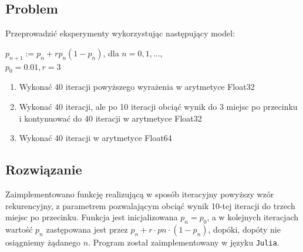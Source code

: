 \documentclass{article}
\begin{document}
        \subsection{Problem}
            Przeprowadzić eksperymenty wykorzystując następujący model:
            \begin{center}
                $p_{n+1} := p_n + rp_{n}(1 - p_n)$, dla $n = 0, 1, . . . ,$ \\
                $p_0 = 0.01, r = 3$
            \end{center}
            \begin{enumerate}
                \item Wykonać 40 iteracji powyższego wyrażenia w arytmetyce Float32
                \item Wykonać 40 iteracji, ale po 10 iteracji obciąć wynik do 3 miejsc po przecinku i kontynuować do 40 iteracji w arytmetyce Float32
                \item Wykonać 40 iteracji w arytmetyce Float64
            \end{enumerate}
        \subsection{Rozwiązanie}
            Zaimplementowano funkcję realizującą w sposób iteracyjny powyższy wzór rekurencyjny, z parametrem pozwalającym obciąć wynik 10-tej iteracji do trzech miejsc po przecinku. Funkcja jest inicjalizowana $p_n = p_0$, a w kolejnych iteracjach wartość $p_n$ zastępowana jest przez $p_n + r \cdot pn \cdot (1 - p_n)$, dopóki, dopóty nie osiągniemy żądanego $n$. Program został zaimplementowany w języku \texttt{Julia}.
\end{document}
